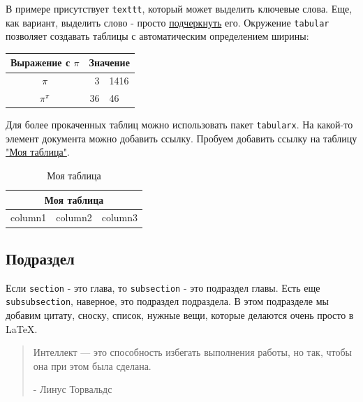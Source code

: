 \documentclass{article}
\begin{document}
    В примере присутствует \texttt{texttt}, который может выделить ключевые слова.
    Еще, как вариант, выделить слово - просто \underline{подчеркнуть} его.
    Окружение \texttt{tabular} позволяет создавать таблицы с автоматическим определением ширины:

    \begin{center}
        \begin{tabular}{c r @{.} l}
            Выражение с $\pi$ &
            \multicolumn{2}{c}{Значение} \\
            \hline
            $\pi$ & 3&1416 \\
            $\pi^{\pi}$ & 36&46 \\
        \end{tabular}
    \end{center}

    Для более прокаченных таблиц можно использовать пакет \texttt{tabularx}.
    На какой-то элемент документа можно добавить ссылку.
    Пробуем добавить ссылку на таблицу \hyperref[tab:just-1]{"Моя таблица"}.

    \begin{table}[!ht]
        \begin{tabularx}{\textwidth}{|X|X|X|}
            \hline
            \multicolumn{3}{|c|}{Моя таблица}   \\ \hline
            column1    & column2    & column3    \\ \hline
        \end{tabularx}
        \caption{Моя таблица}\label{tab:just-1}
    \end{table}

    \subsection{Подраздел}

    Если \texttt{section} - это глава, то \texttt{subsection} - это подраздел главы.
    Есть еще \texttt{subsubsection}, наверное, это подраздел подраздела.
    В этом подразделе мы добавим цитату, сноску, список, нужные вещи, которые делаются очень просто в \LaTeX{}.

    \begin{quote}
        Интеллект — это способность избегать выполнения работы, но так, чтобы она при этом была сделана.
        \begin{flushright}
            - Линус Торвальдс
        \end{flushright}
    \end{quote}
\end{document}
